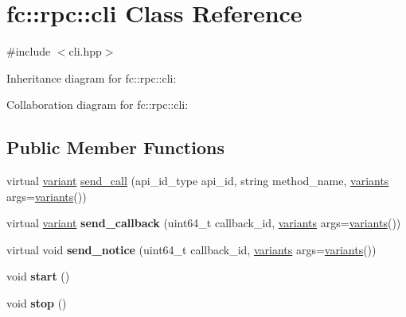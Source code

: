 \hypertarget{classfc_1_1rpc_1_1cli}{}\section{fc\+:\+:rpc\+:\+:cli Class Reference}
\label{classfc_1_1rpc_1_1cli}


{\ttfamily \#include $<$cli.\+hpp$>$}



Inheritance diagram for fc\+:\+:rpc\+:\+:cli\+:


Collaboration diagram for fc\+:\+:rpc\+:\+:cli\+:
\subsection*{Public Member Functions}
\begin{DoxyCompactItemize}
\item 
virtual \mbox{\hyperlink{classfc_1_1variant}{variant}} \mbox{\hyperlink{classfc_1_1rpc_1_1cli_ab42308885a2df6f53bef3c9407d5e775}{send\+\_\+call}} (api\+\_\+id\+\_\+type api\+\_\+id, string method\+\_\+name, \mbox{\hyperlink{classstd_1_1vector}{variants}} args=\mbox{\hyperlink{classstd_1_1vector}{variants}}())
\item 
\mbox{\label{classfc_1_1rpc_1_1cli_a386f494f901a7abfba5ab682be6dd489}} 
virtual \mbox{\hyperlink{classfc_1_1variant}{variant}} {\bfseries send\+\_\+callback} (uint64\+\_\+t callback\+\_\+id, \mbox{\hyperlink{classstd_1_1vector}{variants}} args=\mbox{\hyperlink{classstd_1_1vector}{variants}}())
\item 
\mbox{\label{classfc_1_1rpc_1_1cli_afa3a01d9134551ba945efe8264838583}} 
virtual void {\bfseries send\+\_\+notice} (uint64\+\_\+t callback\+\_\+id, \mbox{\hyperlink{classstd_1_1vector}{variants}} args=\mbox{\hyperlink{classstd_1_1vector}{variants}}())
\item 
\mbox{\label{classfc_1_1rpc_1_1cli_a5ca2f4c807517379e93cbe65371f599d}} 
void {\bfseries start} ()
\item 
\mbox{\label{classfc_1_1rpc_1_1cli_ae5e9817886a423fcf8f78fa3fbd894cc}} 
void {\bfseries stop} ()
\item 
\mbox{\label{classfc_1_1rpc_1_1cli_ae273a9d552292105027c5a508403f934}} 

\end{DoxyCompactItemize}
